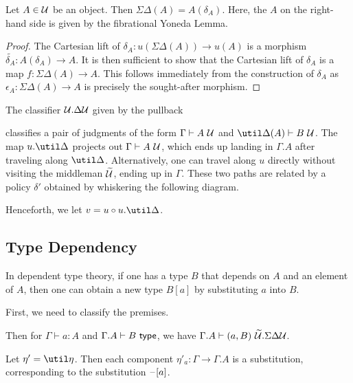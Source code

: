 \documentclass{amsart}
\begin{document}
\begin{lem}
  Let $A \in \mathcal{U}$ be an object.
  Then $\Sigma\Delta(A) = A(\delta_{A})$.
  Here, the $A$ on the right-hand side is given by the fibrational Yoneda Lemma.
\end{lem}
\begin{proof}
  The Cartesian lift of $\delta_{A} : u(\Sigma\Delta(A)) \to u(A)$ is a morphism $\widetilde{\delta_{A}} : A(\delta_{A}) \to A$.
  It is then sufficient to show that the Cartesian lift of $\delta_{A}$ is a map $f : \Sigma\Delta(A) \to A$.
  This follows immediately from the construction of $\delta_{A}$ as $\epsilon_{A} : \Sigma\Delta(A) \to A$ is precisely the sought-after morphism.
\end{proof}

The classifier $\mathcal{U}.\Delta\mathcal{U}$ given by the pullback

classifies a pair of judgments of the form $\Gamma \vdash A~\mathcal{U}$ and $\util\Delta(A) \vdash B~\Ty$.
The map $u.\util\Delta$ projects out $\Gamma \vdash A~\mathcal{U}$, which ends up landing in $\Gamma.A$ after traveling along $\util\Delta$.
Alternatively, one can travel along $u$ directly without visiting the middleman $\widetilde{\mathcal{U}}$, ending up in $\Gamma$.
These two paths are related by a policy $\delta'$ obtained by whiskering the following diagram.

Henceforth, we let $v = u \circ u.\util\Delta$.

\subsection{Type Dependency}
\label{sec:type-dependency}

In dependent type theory, if one has a type $B$ that depends on $A$ and an element of $A$, then one can obtain a new type $B[a]$ by substituting $a$ into $B$.
First, we need to classify the premises.

Then for $\Gamma \vdash a : A$ and $\Gamma.A \vdash B ~\mathsf{type}$, we have $\Gamma.A \vdash (a, B)~\widetilde{\mathcal{U}}.\Sigma\Delta\mathcal{U}$.

Let $\eta' = \util\eta$.
Then each component $\eta'_{a} : \Gamma \to \Gamma.A$ is a substitution, corresponding to the substitution $\mathord{\hspace{1pt}\text{--}\hspace{1pt}}[a]$.

\end{document}
